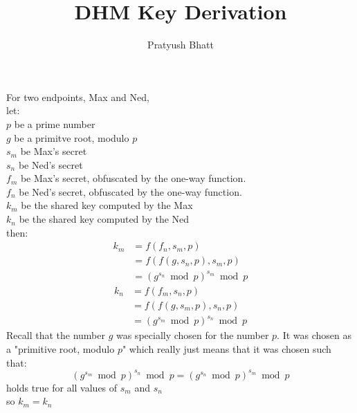 \documentclass[11pt]{article}
\title{\textbf{DHM Key Derivation}}
\author{Pratyush Bhatt}
\date{}
\begin{document}
For two endpoints, Max and Ned,\\

let:\\
\(p\) be a prime number\\
\(g\) be a primitve root, modulo \(p\)\\
\(s_{m}\) be Max's secret\\
\(s_{n}\) be Ned's secret\\
\(f_{m}\) be Max's secret, obfuscated by the one-way function.\\
\(f_{n}\) be Ned's secret, obfuscated by the one-way function.\\
\(k_{m}\) be the shared key computed by the Max\\
\(k_{n}\) be the shared key computed by the Ned\\

then:\\
\begin{equation}
\begin{aligned}
k_{m} &= f( f_{n}, s_{m}, p)\\
 & = f( f(g, s_{n}, p), s_{m}, p)\\
 & = (g^{s_{n}} \bmod p) ^ {s_{m}} \bmod p 
\end{aligned}
\end{equation}
\begin{equation}
\begin{aligned}
k_{n} &= f( f_{m}, s_{n}, p)\\
 & = f( f(g, s_{m}, p), s_{n}, p)\\
 & = (g^{s_{m}} \bmod p) ^ {s_{n}} \bmod p 
\end{aligned}
\end{equation}
Recall that the number \(g\) was specially chosen for the number \(p\). It was chosen as a "primitive root, modulo \(p\)" which really just means that it was chosen such that:
\begin{equation}
 (g ^ {s_{m}} \bmod p) ^ {s_{n}} \bmod p = (g ^ {s_{n}} \bmod p) ^ {s_{m}} \bmod p
\end{equation}
holds true for all values of \(s_{m}\) and \(s_{n}\)\\
so \(k_{m} = k_{n}\)
\end{document}
